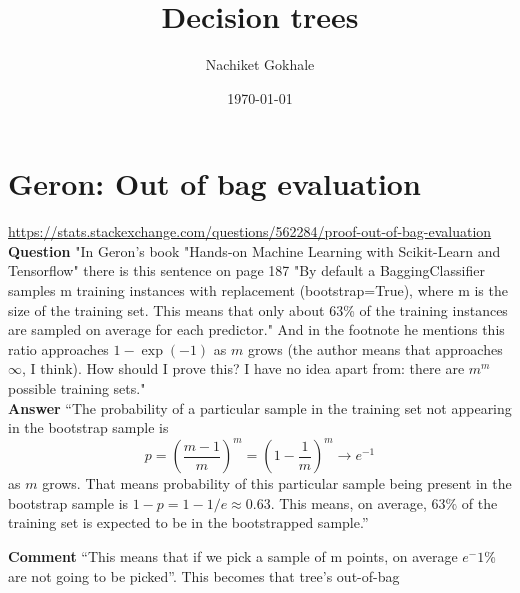 \documentclass{article}
\begin{document}
\title{Decision trees}
\author{Nachiket Gokhale}
\date{\today}
\maketitle
\section{Geron: Out of bag evaluation}
\url{https://stats.stackexchange.com/questions/562284/proof-out-of-bag-evaluation}
\textbf{Question} "In Geron's book "Hands-on Machine Learning with Scikit-Learn and Tensorflow" there is this sentence on page 187 "By default a BaggingClassifier samples m training instances with replacement (bootstrap=True), where m is the size of the training set. This means that only about 63\% of the training instances are sampled on average for each predictor."  And in the footnote he mentions this ratio approaches $1-\exp(-1)$ as $m$ grows (the author means that approaches $\infty$, I think). How should I prove this? I have no idea apart from: there are $m^m$ possible training sets."\\
\textbf{Answer} ``The probability of a particular sample in the training set not appearing in the bootstrap sample is 
$$p=\left(\frac{m-1}{m}\right)^m=\left(1-\frac{1}{m}\right)^m\rightarrow e^{-1}$$ as $m$ grows. That means probability of this particular sample being present in the bootstrap sample is $1-p=1-1/e\approx 0.63$. This means, on average, $63\%$ of the training set is expected to be in the bootstrapped sample.''

\textbf{Comment} ``This means that if we pick a sample of m points, on average $e^-1$\% are not going to be picked''. This becomes that tree's out-of-bag
\end{document}
